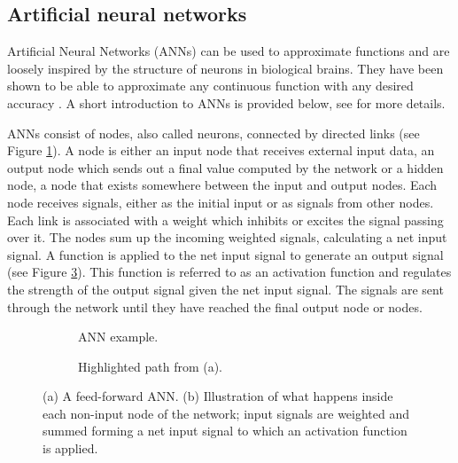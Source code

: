 \newpage
\subsection{Artificial neural networks}
Artificial Neural Networks (ANNs) can be used to approximate functions and are loosely inspired by the structure
of neurons in biological brains.
They have been shown to be able to approximate any continuous function with any desired accuracy \cite{universality_formal,universality_informal}.
A short introduction to ANNs is provided below, see \cite{compint} for more details.

ANNs consist of nodes, also called neurons, connected by directed links (see Figure \ref{feedforward}).
A node is either an input node that receives external input data, an output node which sends out a final value computed
by the network or a hidden node, a node that exists somewhere between the input and output nodes. Each node receives signals, either
as the initial input or as signals from other nodes. Each link is associated with a weight which inhibits or excites the signal
passing over it. The nodes sum up the incoming weighted signals, calculating a net input signal. A function is applied to the net input
signal to generate an output signal (see Figure \ref{neuron}). This function is referred to as an activation function and regulates the strength of the output
signal given the net input signal. The signals are sent through the network until they have reached the final output node or nodes.


\begin{figure}[htb]
    \begin{mdframed}
        \begin{subfigure}[b]{0.5\textwidth}
            \centering
            \resizebox{0.7\textwidth}{!}{}
            \caption{ANN example.}
            \label{feedforward}
        \end{subfigure}
        \begin{subfigure}[b]{0.5\textwidth}
            \centering
            \resizebox{0.9\textwidth}{!}{}
            \caption{Highlighted path from (a).}
            \label{neuron}
        \end{subfigure}
    \end{mdframed}
    \caption{(a) A feed-forward ANN. (b) Illustration of what happens inside each non-input node of the network; input
                 signals are weighted and summed forming a net input signal to which an activation function is applied.}
\end{figure}

